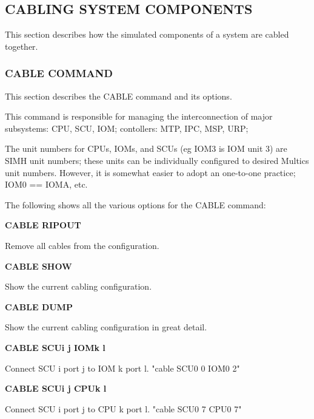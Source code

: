 \subsection[Cabling System Components]{CABLING SYSTEM COMPONENTS}

This section describes how the simulated components of a system are cabled together.

\subsubsection[CABLE Command]{CABLE COMMAND}

This section describes the CABLE command and its options.

This command is responsible for managing the interconnection of 
major subsystems: CPU, SCU, IOM; contollers: MTP, IPC, MSP, URP;

The unit numbers for CPUs, IOMs, and SCUs (eg IOM3 is IOM unit 3) are
SIMH unit numbers; these units can be individually configured to
desired Multics unit numbers. However, it is somewhat easier to 
adopt an one-to-one practice; IOM0 == IOMA, etc.

The following shows all the various options for the CABLE command:

\textbf{CABLE RIPOUT}

\begin{adjustwidth}{5ex}{1ex}
  Remove all cables from the configuration.
\end{adjustwidth}  

\textbf{CABLE SHOW}

\begin{adjustwidth}{5ex}{1ex}
  Show the current cabling configuration.
\end{adjustwidth}  

\textbf{CABLE DUMP}

\begin{adjustwidth}{5ex}{1ex}
  Show the current cabling configuration in great detail.
\end{adjustwidth}  

\textbf{CABLE SCUi j IOMk l}

\begin{adjustwidth}{5ex}{1ex}
  Connect SCU i port j to IOM k port l.
  "cable SCU0 0 IOM0 2"
\end{adjustwidth}  

\textbf{CABLE SCUi j CPUk l}

\begin{adjustwidth}{5ex}{1ex}
  Connect SCU i port j to CPU k port l.
  "cable SCU0 7 CPU0 7"
\end{adjustwidth}  

